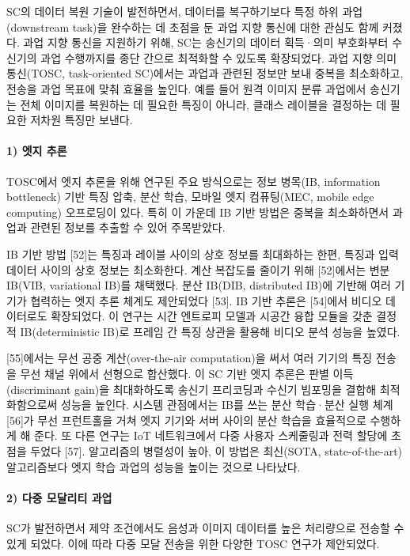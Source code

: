 SC의 데이터 복원 기술이 발전하면서, 데이터를 복구하기보다 특정 하위 과업(downstream task)을 완수하는 데 초점을 둔 과업 지향 통신에 대한 관심도 함께 커졌다.
과업 지향 통신을 지원하기 위해, SC는 송신기의 데이터 획득·의미 부호화부터 수신기의 과업 수행까지를 종단 간으로 최적화할 수 있도록 확장되었다.
과업 지향 의미 통신(TOSC, task-oriented SC)에서는 과업과 관련된 정보만 보내 중복을 최소화하고, 전송을 과업 목표에 맞춰 효율을 높인다.
예를 들어 원격 이미지 분류 과업에서 송신기는 전체 이미지를 복원하는 데 필요한 특징이 아니라, 클래스 레이블을 결정하는 데 필요한 저차원 특징만 보낸다.

\paragraph{1) 엣지 추론}
TOSC에서 엣지 추론을 위해 연구된 주요 방식으로는 정보 병목(IB, information bottleneck) 기반 특징 압축, 분산 학습, 모바일 엣지 컴퓨팅(MEC, mobile edge computing) 오프로딩이 있다.
특히 이 가운데 IB 기반 방법은 중복을 최소화하면서 과업과 관련된 정보를 추출할 수 있어 주목받았다.

IB 기반 방법 [52]는 특징과 레이블 사이의 상호 정보를 최대화하는 한편, 특징과 입력 데이터 사이의 상호 정보는 최소화한다.
계산 복잡도를 줄이기 위해 [52]에서는 변분 IB(VIB, variational IB)를 채택했다.
분산 IB(DIB, distributed IB)에 기반해 여러 기기가 협력하는 엣지 추론 체계도 제안되었다 [53].
IB 기반 추론은 [54]에서 비디오 데이터로도 확장되었다.
이 연구는 시간 엔트로피 모델과 시공간 융합 모듈을 갖춘 결정적 IB(deterministic IB)로 프레임 간 특징 상관을 활용해 비디오 분석 성능을 높였다.

[55]에서는 무선 공중 계산(over-the-air computation)을 써서 여러 기기의 특징 전송을 무선 채널 위에서 선형으로 합산했다.
이 SC 기반 엣지 추론은 판별 이득(discriminant gain)을 최대화하도록 송신기 프리코딩과 수신기 빔포밍을 결합해 최적화함으로써 성능을 높인다.
시스템 관점에서는 IB를 쓰는 분산 학습·분산 실행 체계 [56]가 무선 프런트홀을 거쳐 엣지 기기와 서버 사이의 분산 학습을 효율적으로 수행하게 해 준다.
또 다른 연구는 IoT 네트워크에서 다중 사용자 스케줄링과 전력 할당에 초점을 두었다 [57].
알고리즘의 병렬성이 높아, 이 방법은 최신(SOTA, state-of-the-art) 알고리즘보다 엣지 학습 과업의 성능을 높이는 것으로 나타났다.

\paragraph{2) 다중 모달리티 과업}
SC가 발전하면서 제약 조건에서도 음성과 이미지 데이터를 높은 처리량으로 전송할 수 있게 되었다.
이에 따라 다중 모달 전송을 위한 다양한 TOSC 연구가 제안되었다.

